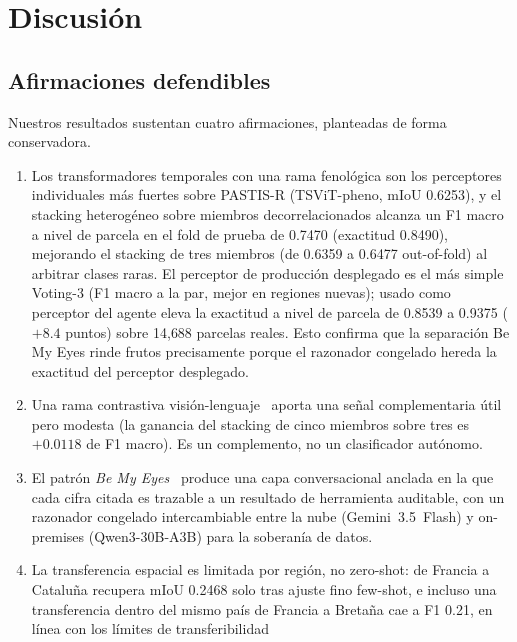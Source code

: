 \section{Discusión}
\label{sec:discussion}

\subsection{Afirmaciones defendibles}
Nuestros resultados sustentan cuatro afirmaciones, planteadas de forma
conservadora.
\begin{enumerate}[leftmargin=*]
    \item Los transformadores temporales con una rama fenológica son los
    perceptores individuales más fuertes sobre PASTIS-R (TSViT-pheno,
    mIoU 0.6253), y el stacking heterogéneo sobre miembros
    decorrelacionados alcanza un F1 macro a nivel de parcela en el fold de
    prueba de 0.7470 (exactitud 0.8490), mejorando el stacking de tres
    miembros (de 0.6359 a 0.6477 out-of-fold) al arbitrar clases raras.
    El perceptor de producción desplegado es el más simple Voting-3 (F1
    macro a la par, mejor en regiones nuevas); usado como perceptor del
    agente eleva la exactitud a nivel de parcela de 0.8539 a 0.9375
    ($+8.4$ puntos) sobre 14{,}688 parcelas reales. Esto confirma que la
    separación Be My Eyes rinde frutos precisamente porque el razonador
    congelado hereda la exactitud del perceptor desplegado.
    \item Una rama contrastiva visión-lenguaje~\cite{li2025farslip}
    aporta una señal complementaria útil pero modesta (la ganancia del
    stacking de cinco miembros sobre tres es $+0.0118$ de F1 macro). Es
    un complemento, no un clasificador autónomo.
    \item El patrón \emph{Be My Eyes}~\cite{huang2025bemyeyes} produce
    una capa conversacional anclada en la que cada cifra citada es
    trazable a un resultado de herramienta auditable, con un razonador
    congelado intercambiable entre la nube (Gemini~3.5~Flash) y on-premises
    (Qwen3-30B-A3B) para la soberanía de datos.
    \item La transferencia espacial es limitada por región, no zero-shot:
    de Francia a Cataluña recupera mIoU 0.2468 solo tras ajuste fino
    few-shot, e incluso una transferencia dentro del mismo país de Francia
    a Bretaña cae a F1 0.21, en línea con los límites de transferibilidad

\end{enumerate}
